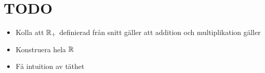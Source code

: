 \section{TODO}\par
\begin{itemize}
  \item Kolla att $\mathbb{R}_+$ definierad från snitt gäller att addition och multiplikation gäller
  \item Konstruera hela $\mathbb{R}$
  \item Få intuition av täthet
\end{itemize}
